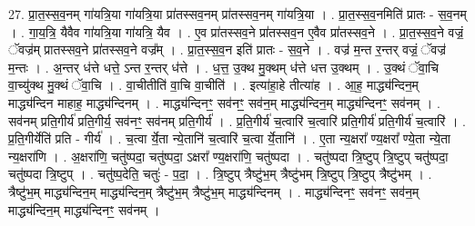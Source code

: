 \documentclass[17pt]{extarticle}
\begin{document}
27. प्रा॒त॒स्स॒व॒नम् गा॑यत्रि॒या गा॑यत्रि॒या प्रा॑तस्सव॒नम् प्रा॑तस्सव॒नम् गा॑यत्रि॒या । . प्रा॒त॒स्स॒व॒नमिति॑ प्रातः - स॒व॒नम् । . गा॒य॒त्रि॒ यैवैव गा॑यत्रि॒या गा॑यत्रि॒ यैव । . ए॒व प्रा॑तस्सव॒ने प्रा॑तस्सव॒न ए॒वैव प्रा॑तस्सव॒ने । . प्रा॒त॒स्स॒व॒ने वज्रं॒ ॅवज्र॑म् प्रातस्सव॒ने प्रा॑तस्सव॒ने वज्र᳚म् । . प्रा॒त॒स्स॒व॒न इति॑ प्रातः - स॒व॒ने । . वज्र॑ म॒न्त र॒न्तर् वज्रं॒ ॅवज्र॑ म॒न्तः । . अ॒न्तर् ध॑त्ते धत्ते॒ ऽन्त र॒न्तर् ध॑त्ते । . ध॒त्त॒ उ॒क्थ मु॒क्थम् ध॑त्ते धत्त उ॒क्थम् । . उ॒क्थं ॅवा॒चि वा॒च्यु॑क्थ मु॒क्थं ॅवा॒चि । . वा॒चीतीति॑ वा॒चि वा॒चीति॑ । . इत्या॑हा॒हे तीत्या॑ह । . आ॒ह॒ माद्ध्य॑न्दिन॒म् माद्ध्य॑न्दिन माहाह॒ माद्ध्य॑न्दिनम् । . माद्ध्य॑न्दिनꣳ॒॒ सव॑नꣳ॒॒ सव॑न॒म् माद्ध्य॑न्दिन॒म् माद्ध्य॑न्दिनꣳ॒॒ सव॑नम् । . सव॑नम् प्रति॒गीर्य॑ प्रति॒गीर्य॒ सव॑नꣳ॒॒ सव॑नम् प्रति॒गीर्य॑ । . प्र॒ति॒गीर्य॑ च॒त्वारि॑ च॒त्वारि॑ प्रति॒गीर्य॑ प्रति॒गीर्य॑ च॒त्वारि॑ । . प्र॒ति॒गीर्येति॑ प्रति - गीर्य॑ । . च॒त्वा र्ये॒ता न्ये॒तानि॑ च॒त्वारि॑ च॒त्वा र्ये॒तानि॑ । . ए॒ता न्य॒क्षरा᳚ ण्य॒क्षरा᳚ ण्ये॒ता न्ये॒ता न्य॒क्षरा॑णि । . अ॒क्षरा॑णि॒ चतु॑ष्पदा॒ चतु॑ष्पदा॒ ऽक्षरा᳚ ण्य॒क्षरा॑णि॒ चतु॑ष्पदा । . चतु॑ष्पदा त्रि॒ष्टुप् त्रि॒ष्टुप् चतु॑ष्पदा॒ चतु॑ष्पदा त्रि॒ष्टुप् । . चतु॑ष्प॒देति॒ चतुः॑ - प॒दा॒ । . त्रि॒ष्टुप् त्रैष्टु॑भ॒म् त्रैष्टु॑भम् त्रि॒ष्टुप् त्रि॒ष्टुप् त्रैष्टु॑भम् । . त्रैष्टु॑भ॒म् माद्ध्य॑न्दिन॒म् माद्ध्य॑न्दिन॒म् त्रैष्टु॑भ॒म् त्रैष्टु॑भ॒म् माद्ध्य॑न्दिनम् । . माद्ध्य॑न्दिनꣳ॒॒ सव॑नꣳ॒॒ सव॑न॒म् माद्ध्य॑न्दिन॒म् माद्ध्य॑न्दिनꣳ॒॒ सव॑नम् । \newline
\end{document}
